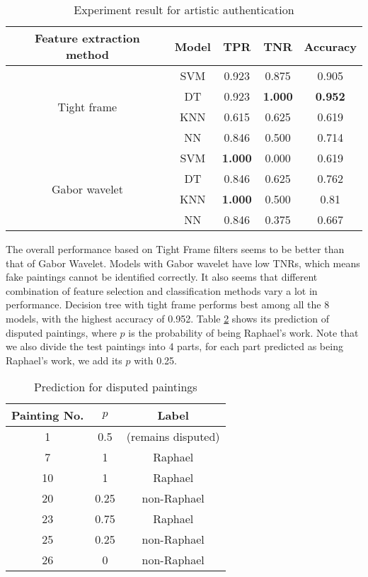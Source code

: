 \documentclass{article}
\begin{document}
\begin{table}[htb]
  \caption{Experiment result for artistic authentication}
  \label{tab:auth}
  \centering
  \begin{tabular}{ccccc}
\hline
Feature extraction method      & Model & TPR   & TNR   & Accuracy \\ \hline
\multirow{4}{*}{Tight frame}   & SVM   & 0.923 & 0.875 & 0.905    \\
                               & DT    & 0.923 & \textbf{1.000}     & \textbf{0.952}    \\
                               & KNN   & 0.615 & 0.625 & 0.619    \\
                               & NN    & 0.846 & 0.500   & 0.714    \\ \hline
\multirow{4}{*}{Gabor wavelet} & SVM   & \textbf{1.000}     & 0.000     & 0.619    \\
                               & DT    & 0.846 & 0.625 & 0.762    \\
                               & KNN   & \textbf{1.000}     & 0.500   & 0.81     \\
                               & NN    & 0.846 & 0.375 & 0.667   \\ \hline
\end{tabular}
\end{table}

The overall performance based on Tight Frame filters seems to be better than that of Gabor Wavelet. 
Models with Gabor wavelet have low TNRs, which means fake paintings cannot be identified correctly. 
It also seems that different combination of feature selection and classification methods vary a lot in performance. 
Decision tree with tight frame performs best among all the 8 models, with the highest accuracy of 0.952. Table \ref{tab:auth-pred} shows its prediction of disputed paintings, where $p$ is the probability of being Raphael's work. Note that we also divide the test paintings into 4 parts, for each part predicted as being Raphael's work, we add its $p$ with 0.25.

\begin{table}[htb]
  \caption{Prediction for disputed paintings}
  \label{tab:auth-pred}
  \centering
  \begin{tabular}{ccc}
\hline
Painting No. & $p$  & Label  \\ \hline
1            & 0.5 & (remains disputed) \\
7            & 1  & Raphael  \\
10           & 1  & Raphael  \\
20           & 0.25 & non-Raphael \\
23           & 0.75 & Raphael \\
25           & 0.25 & non-Raphael \\
26           & 0  & non-Raphael  \\ \hline
\end{tabular}
\end{table}
\end{document}

